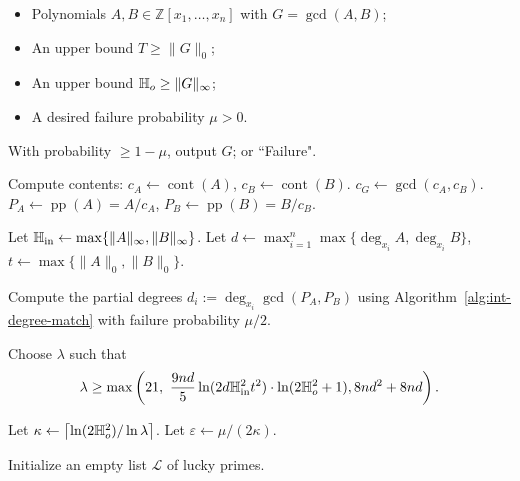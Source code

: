 \documentclass{article}
\numberwithin{equation}{section}
\begin{document}
\begin{algorithm}
\caption{Integer GCD via Small Primes}
\label{alg:intgcd-crt}
\begin{algorithmic}[1]
\Require
    \begin{itemize}
        \item Polynomials $A, B \in \mathbb{Z}[x_1, \dots, x_n]$ with $G = \gcd(A,B)$;
        \item An upper bound $T\ge \|G\|_0$;
        \item An upper bound $\mathbb{H}_{o}\ge \|G\|_{\infty}$;
        \item A desired failure probability $\mu > 0$.
    \end{itemize}
\Ensure
    With probability $\ge 1-\mu$, output $G$; or ``Failure".

\State Compute contents: $c_A \gets \operatorname{cont}(A)$, $c_B \gets \operatorname{cont}(B)$.
\State $c_G \gets \gcd(c_A, c_B)$.
\State $P_A \gets \operatorname{pp}(A) = A / c_A$, $P_B \gets \operatorname{pp}(B) = B / c_B$.

\State Let $\mathbb{H}_{\rm in} \gets \max\{\|A\|_\infty, \|B\|_\infty\}$.
\State Let $d \gets \max_{i=1}^n \max\{\deg_{x_i} A, \deg_{x_i} B\}$, $t \gets \max\{\|A\|_0, \|B\|_0\}$.

\State Compute the partial degrees $d_i := \deg_{x_i} \gcd(P_A, P_B)$ using Algorithm~\ref{alg:int-degree-match} with failure probability $\mu/2$.

\State Choose $\lambda$ such that
\[
\lambda \ge \max\left(
    21,\ 
    \frac{9nd}{5} \ln(2d \Hi^2 t^2)\cdot \ln(2\Ho^2+1), 8nd^2 + 8nd 
\right).
\]

\State Let $\kappa \gets \left\lceil \ln(2\mathbb{H}_{o}^2) / \ln \lambda \right\rceil$.
\State Let $\varepsilon \gets \mu / (2\kappa)$.

\State Initialize an empty list $\mathcal{L}$ of lucky primes.

\end{algorithmic}
\end{algorithm}
\end{document}
